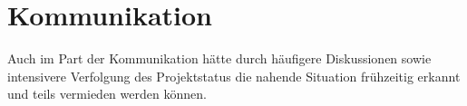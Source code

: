 \section{Kommunikation}
Auch im Part der Kommunikation hätte durch häufigere Diskussionen sowie intensivere Verfolgung des Projektstatus die nahende Situation frühzeitig erkannt und teils vermieden werden können.